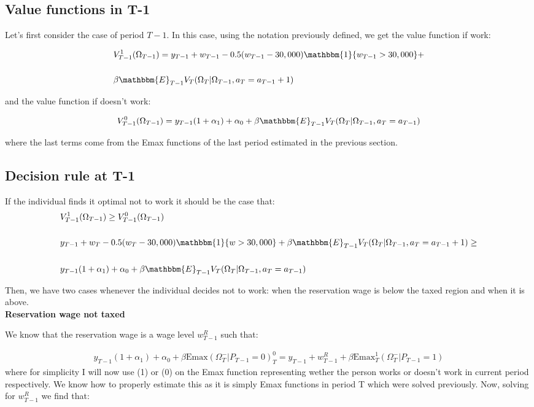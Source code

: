 \documentclass[11pt]{article}
\begin{document}
\subsection{Value functions in T-1}

Let's first consider the case of period $T-1$. In this case, using the notation previously defined, we get the value function if work:

\begin{align}
	& V_{T-1}^1(\Omega_{T-1})=y_{T-1}+w_{T-1}-0.5(w_{T-1}-30,000)\mathbbm{1}\{w_{T-1}>30,000\}+\nonumber \\[0.2in]
	& \beta \mathbbm{E}_{T-1}V_T(\Omega_T|\Omega_{T-1},a_{T}=a_{T-1}+1)
\end{align}

and the value function if doesn't work:

\begin{align}
	V_{T-1}^0(\Omega_{T-1})=y_{T-1}(1+\alpha_1)+\alpha_0+\beta \mathbbm{E}_{T-1}V_T(\Omega_T|\Omega_{T-1},a_{T}=a_{T-1})
\end{align}

where the last terms come from the Emax functions of the last period estimated in the previous section. 
\subsection{Decision rule at T-1}

If the individual finds it optimal not to work it should be the case that:
\begin{align}
	 & V_{T-1}^1(\Omega_{T-1})\geq V_{T-1}^0(\Omega_{T-1}) \nonumber \\[0.2in]
	 & y_{T-1}+w_T-0.5(w_T-30,000)\mathbbm{1}\{w>30,000\}+\beta \mathbbm{E}_{T-1}V_T(\Omega_T|\Omega_{T-1},a_{T}=a_{T-1}+1) \geq \nonumber \\[0.2in]
	& y_{T-1}(1+\alpha_1)+\alpha_0+\beta \mathbbm{E}_{T-1}V_T(\Omega_T|\Omega_{T-1},a_{T}=a_{T-1})
\end{align}

Then, we have two cases whenever the individual decides not to work: when the reservation wage is below the taxed region and when it is above. 
\\
\textbf{Reservation wage not taxed}

We know that the reservation wage is a wage level $w_{T-1}^R$ such that:

\begin{align}
	y_{T-1}(1+\alpha_1)+\alpha_0+\beta \text{Emax}(\Omega_T^-|P_{T-1}=0)_T^0=y_{T-1}+w_{T-1}^R+\beta \text{Emax}_{T}^1(\Omega_T^-|P_{T-1}=1)
\end{align}
where for simplicity I will now use (1) or (0) on the Emax function representing wether the person works or doesn't work in current period respectively. We know how to properly estimate this as it is simply Emax functions in period T which were solved previously. Now, solving for $w_{T-1}^R$ we find that:
\end{document}
